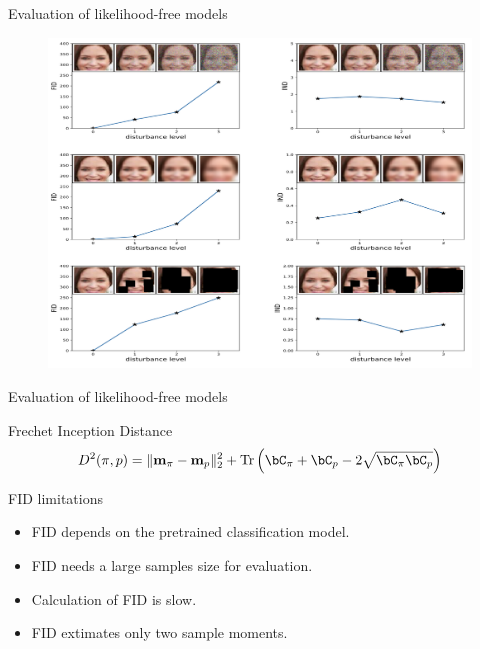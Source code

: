 \begin{frame}{Evaluation of likelihood-free models}
	\begin{figure}
		\centering
		\includegraphics[width=0.9\linewidth]{figs/fid_results}
	\end{figure}
	
\end{frame}
\begin{frame}{Evaluation of likelihood-free models}
	\begin{block}{Frechet Inception Distance}
		\vspace{-0.1cm}
		\[
		D^2 (\pi, p) = \| \mathbf{m}_{\pi} - \mathbf{m}_{p}\|_2^2 + \text{Tr} \left( \bC_{\pi} + \bC_p - 2 \sqrt{\bC_{\pi} \bC_p} \right)
		\]
	\end{block}
	\begin{block}{FID limitations}
		\begin{itemize}
			\item FID depends on the pretrained classification model.
			\item FID needs a large samples  size for evaluation.
			\item Calculation of FID is slow.
			\item FID extimates only two sample moments.
		\end{itemize}
	\end{block}

\end{frame}
